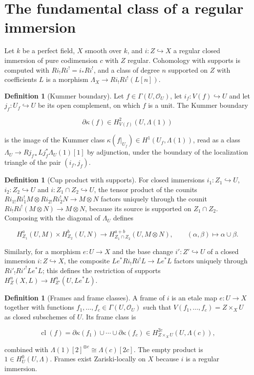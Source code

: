 \documentclass[10pt]{article}
\theoremstyle{definition}
\newtheorem{definition}[theorem]{Definition}
\begin{document}
\section{The fundamental class of a regular immersion}

Let \(k\) be a perfect field, \(X\) smooth over \(k\), and
\(i:Z\hookrightarrow X\) a regular closed immersion of pure codimension
\(c\) with \(Z\) regular.  Cohomology with supports is computed with
\(Ri_!Ri^!=i_*Ri^!\), and a class of degree \(n\) supported on \(Z\) with
coefficients \(L\) is a morphism \(\Lambda_X\to Ri_!Ri^!(L[n])\).

\begin{definition}[Kummer boundary]
Let \(f\in\Gamma(U,\mathcal O_U)\), let \(i_f:V(f)\hookrightarrow U\) and
let \(j_f:U_f\hookrightarrow U\) be its open complement, on which \(f\) is a
unit.  The Kummer boundary

\[
 \partial\kappa(f)\in H^2_{V(f)}(U,\Lambda(1))
\]

is the image of the Kummer class
\(\kappa(f|_{U_f})\in H^1(U_f,\Lambda(1))\), read as a class
\(\Lambda_U\to Rj_{f*}Lj_f^*\Lambda_U(1)[1]\) by adjunction, under the
boundary of the localization triangle of the pair \((i_f,j_f)\).
\end{definition}

\begin{definition}[Cup product with supports]
For closed immersions \(i_1:Z_1\hookrightarrow U\),
\(i_2:Z_2\hookrightarrow U\) and \(i:Z_1\cap Z_2\hookrightarrow U\), the
tensor product of the counits
\(Ri_{1!}Ri_1^!M\otimes Ri_{2!}Ri_2^!N\to M\otimes N\) factors uniquely
through the counit \(Ri_!Ri^!(M\otimes N)\to M\otimes N\), because its source
is supported on \(Z_1\cap Z_2\).  Composing with the diagonal of
\(\Lambda_U\) defines

\[
 H^a_{Z_1}(U,M)\times H^b_{Z_2}(U,N)\longrightarrow
 H^{a+b}_{Z_1\cap Z_2}(U,M\otimes N),\qquad
 (\alpha,\beta)\longmapsto\alpha\cup\beta.
\]

Similarly, for a morphism \(e:U\to X\) and the base change
\(i':Z'\hookrightarrow U\) of a closed immersion \(i:Z\hookrightarrow X\),
the composite \(Le^*Ri_!Ri^!L\to Le^*L\) factors uniquely through
\(Ri'_!Ri'^!Le^*L\); this defines the restriction of supports
\(H^n_Z(X,L)\to H^n_{Z'}(U,Le^*L)\).
\end{definition}

\begin{definition}[Frames and frame classes]
A frame of \(i\) is an etale map \(e:U\to X\) together with functions
\(f_1,\dots,f_c\in\Gamma(U,\mathcal O_U)\) such that
\(V(f_1,\dots,f_c)=Z\times_XU\) as closed subschemes of \(U\).  Its frame
class is

\[
 \operatorname{cl}(f)=\partial\kappa(f_1)\cup\cdots\cup\partial\kappa(f_c)
 \in H^{2c}_{Z\times_XU}(U,\Lambda(c)),
\]

combined with \(\Lambda(1)[2]^{\otimes c}\cong\Lambda(c)[2c]\).  The empty
product is \(1\in H^0_U(U,\Lambda)\).  Frames exist Zariski-locally on \(X\)
because \(i\) is a regular immersion.
\end{definition}
\end{document}
